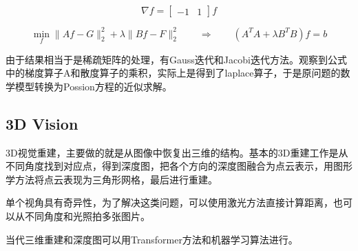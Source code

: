 \[
\nabla f = \begin{bmatrix} -1 & 1 \end{bmatrix} f
\]

\[
\min_f \|Af - G\|_2^2 + \lambda \|Bf - F\|_2^2
\qquad \Longrightarrow \qquad
\left(A^T A + \lambda B^T B\right) f = b
\]

由于结果相当于是稀疏矩阵的处理，有Gauss迭代和Jacobi迭代方法。观察到公式中的梯度算子A和散度算子的乘积，实际上是得到了laplace算子，于是原问题的数学模型转换为Possion方程的近似求解。

\subsection{3D Vision}

3D视觉重建，主要做的就是从图像中恢复出三维的结构。基本的3D重建工作是从不同角度找到对应点，得到深度图，把各个方向的深度图融合为点云表示，用图形学方法将点云表现为三角形网格，最后进行重建。

单个视角具有奇异性，为了解决这类问题，可以使用激光方法直接计算距离，也可以从不同角度和光照拍多张图片。

当代三维重建和深度图可以用Transformer方法和机器学习算法进行。
